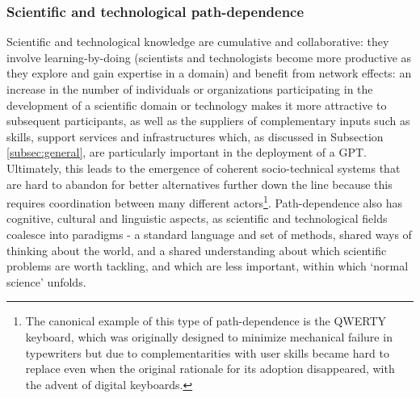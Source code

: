 \documentclass[11pt]{article}
\begin{document}
\subsubsection*{Scientific and technological path-dependence}
\label{subsec:technology}
Scientific and technological knowledge are cumulative and collaborative: they involve learning-by-doing (scientists and technologists become more productive as they explore and gain expertise in a domain) and benefit from network effects: an increase in the number of individuals or organizations participating in the development of a scientific domain or technology makes it more attractive to subsequent participants, as well as the suppliers of complementary inputs such as skills, support services and infrastructures which, as discussed in Subsection \ref{subsec:general}, are particularly important in the deployment of a GPT. Ultimately, this leads to the emergence of coherent socio-technical systems that are hard to abandon for better alternatives further down the line because this requires coordination between many different actors\footnote{The canonical example of this type of path-dependence is the QWERTY keyboard, which was originally designed to minimize mechanical failure in typewriters but due to complementarities with user skills became hard to replace even when the original rationale for its adoption disappeared, with the advent of digital keyboards.}. Path-dependence also has cognitive, cultural and linguistic aspects, as scientific and technological fields coalesce into paradigms -  a standard language and set of methods, shared ways of thinking about the world, and a shared understanding about which scientific problems are worth tackling, and which are less important, within which `normal science' unfolds. 
\end{document}
